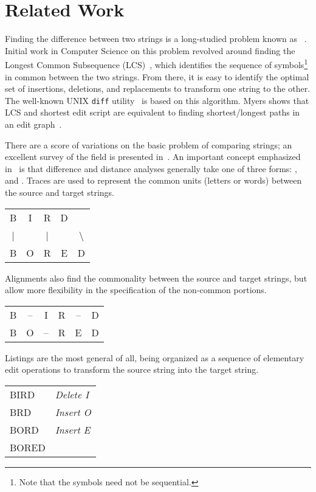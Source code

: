 \section{Related Work}
\label{sec:diff-related}

Finding the difference between two strings is a long-studied problem
known as ~\cite{Wagner1974}.
Initial work in Computer Science on this problem revolved around finding the
Longest Common Subsequence (LCS)~\cite{Gusfield1999}, which identifies the
sequence of symbols\footnote{Note that the symbols need not be sequential.}
in common between the two strings.
From there, it is easy to identify the optimal
set of insertions, deletions, and replacements to transform
one string to the other.
The well-known UNIX \texttt{diff} utility~\cite{Hunt1976} is based
on this algorithm.
Myers shows that LCS and shortest edit script are equivalent to finding
shortest/longest paths in an edit graph~\cite{Myers1986}.

There are a score of variations on the basic problem of
comparing strings; an excellent survey of the field is
presented in~\cite{Sankoff1999}.
An important concept emphasized in~\cite{Sankoff1999} is that
difference and distance analyses generally take one of
three forms: ,  and .
Traces are used to represent the common units (\eg letters or words)
between the source and target strings.
\begin{center}
  \begin{tabular}{c c c c c}
B & I & R & D & \\
| &   & | &   & $\!\!\!\!\!\!\!\!\!\!$\textbackslash \\
B & O & R & E & D \\
  \end{tabular}
\end{center}
Alignments also find the commonality between the source and target
strings, but allow more flexibility in the specification of
the non-common portions.
\begin{center}
  \begin{tabular}{c c c c c c}
B & -- & I & R & -- & D \\
B & O & -- & R & E & D \\
  \end{tabular}
\end{center}
Listings are the most general of all, being
organized as a sequence of elementary edit operations
to transform the source string into the target string.
\begin{center}
  \begin{tabular}{l l}
  BIRD & \textit{Delete I} \\
  BRD & \textit{Insert O} \\
  BORD & \textit{Insert E} \\
  BORED & \\
  \end{tabular}
\end{center}

